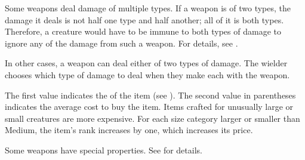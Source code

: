         Some weapons deal damage of multiple types. If a weapon is of two types, the damage it deals is not half one type and half another; all of it is both types.
        Therefore, a creature would have to be immune to both types of damage to ignore any of the damage from such a weapon.
        For details, see .

        In other cases, a weapon can deal either of two types of damage.
        The wielder chooses which type of damage to deal when they make each  with the weapon.

         The first value indicates the  of the item (see ).
        The second value in parentheses indicates the average cost to buy the item.
        Items crafted for unusually large or small creatures are more expensive.
        For each size category larger or smaller than Medium, the item's rank increases by one, which increases its price.

         Some weapons have special properties. See  for details.

